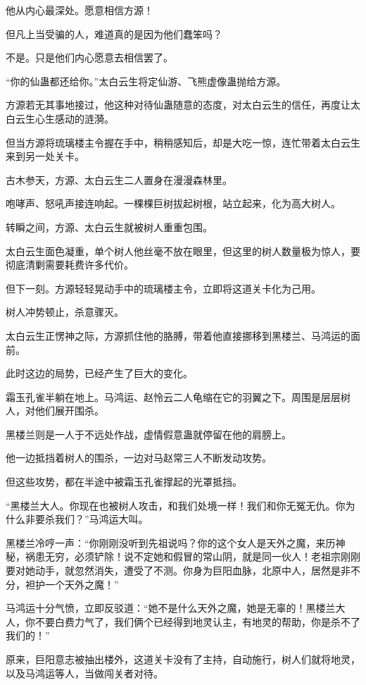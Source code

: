 \begin{this_body}
他从内心最深处。愿意相信方源！

但凡上当受骗的人，难道真的是因为他们蠢笨吗？

不是。只是他们内心愿意去相信罢了。

“你的仙蛊都还给你。”太白云生将定仙游、飞熊虚像蛊抛给方源。

方源若无其事地接过，他这种对待仙蛊随意的态度，对太白云生的信任，再度让太白云生心生感动的涟漪。

但当方源将琉璃楼主令握在手中，稍稍感知后，却是大吃一惊，连忙带着太白云生来到另一处关卡。

古木参天，方源、太白云生二人置身在漫漫森林里。

咆哮声、怒吼声接连响起。一棵棵巨树拔起树根，站立起来，化为高大树人。

转瞬之间，方源、太白云生就被树人重重包围。

太白云生面色凝重，单个树人他丝毫不放在眼里，但这里的树人数量极为惊人，要彻底清剿需要耗费许多代价。

但下一刻。方源轻轻晃动手中的琉璃楼主令，立即将这道关卡化为己用。

树人冲势顿止，杀意骤灭。

太白云生正愣神之际，方源抓住他的胳膊，带着他直接挪移到黑楼兰、马鸿运的面前。

此时这边的局势，已经产生了巨大的变化。

霜玉孔雀半躺在地上。马鸿运、赵怜云二人龟缩在它的羽翼之下。周围是层层树人，对他们展开围杀。

黑楼兰则是一人于不远处作战，虚情假意蛊就停留在他的肩膀上。

他一边抵挡着树人的围杀，一边对马赵常三人不断发动攻势。

但这些攻势，都在半途中被霜玉孔雀撑起的光罩抵挡。

“黑楼兰大人。你现在也被树人攻击，和我们处境一样！我们和你无冤无仇。你为什么非要杀我们？”马鸿运大叫。

黑楼兰冷哼一声：“你刚刚没听到先祖说吗？你的这个女人是天外之魔，来历神秘，祸患无穷，必须铲除！说不定她和假冒的常山阴，就是同一伙人！老祖宗刚刚要对她动手，就忽然消失，遭受了不测。你身为巨阳血脉，北原中人，居然是非不分，袒护一个天外之魔！”

马鸿运十分气愤，立即反驳道：“她不是什么天外之魔，她是无辜的！黑楼兰大人，你不要白费力气了，我们俩个已经得到地灵认主，有地灵的帮助，你是杀不了我们的！”

原来，巨阳意志被抽出楼外，这道关卡没有了主持，自动施行，树人们就将地灵，以及马鸿运等人，当做闯关者对待。


\end{this_body}
